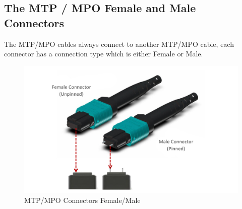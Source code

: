   \subsection{The MTP / MPO Female and Male Connectors}
  The MTP/MPO cables always connect to another MTP/MPO cable, each connector has a connection type which is either Female or Male.
  \begin{figure}
    \includegraphics[width=\textwidth]{images/5.jpeg}
    \caption{MTP/MPO Connectors Female/Male}
  \end{figure}

\newpage
